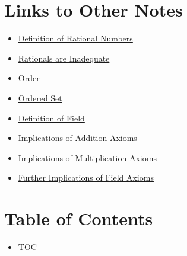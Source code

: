 \section*{Links to Other Notes}
\begin{itemize}
  \item \hyperref[202501131947]{Definition of Rational Numbers}
  \item \hyperref[202501132004]{Rationals are Inadequate}
  \item \hyperref[202501141228]{Order}
  \item \hyperref[202501141241]{Ordered Set}
  \item \hyperref[202501150657]{Definition of Field}
  \item \hyperref[202501150717]{Implications of Addition Axioms}
  \item \hyperref[202501150809]{Implications of Multiplication Axioms}
  \item \hyperref[202501152115]{Further Implications of Field Axioms}
\end{itemize}

\section*{Table of Contents}

\begin{itemize}
  \item \hyperref[toc]{TOC}
\end{itemize}

